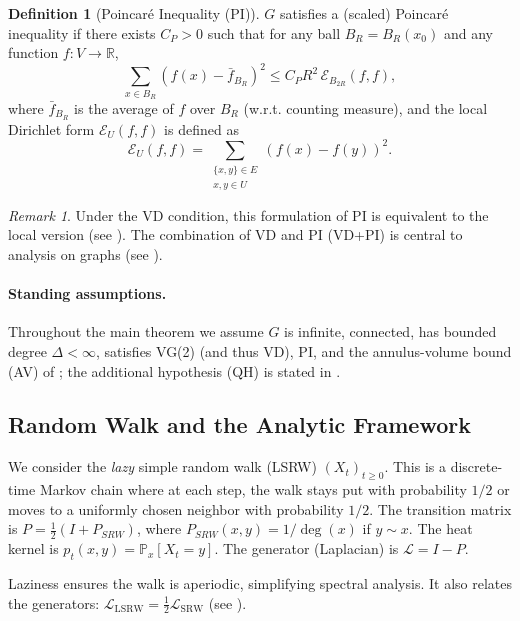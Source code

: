 \documentclass[reqno]{amsart}
\numberwithin{equation}{section}
\theoremstyle{definition}
\newtheorem{definition}[definition]{Definition}
\theoremstyle{remark}
\newtheorem{remark}[remark]{Remark}
\newcommand{\cE}{\mathcal{E}}
\newcommand{\LL}{\mathcal{L}}
\newcommand{\R}{\mathbb{R}}
\newcommand{\Prob}{\mathbb{P}}
\begin{document}
\begin{definition}[Poincaré Inequality (PI)]\label{def:PI}
$G$ satisfies a (scaled) Poincaré inequality if there exists $C_P > 0$ such that for any ball $B_R=B_R(x_0)$ and any function $f: V \to \R$,
\[
\sum_{x \in B_R} (f(x) - \bar{f}_{B_R})^2 \leq C_P R^2 \, \cE_{B_{2R}}(f,f),
\]
where $\bar{f}_{B_R}$ is the average of $f$ over $B_R$ (w.r.t. counting measure), and the local Dirichlet form $\cE_U(f,f)$ is defined as
\[
\cE_U(f,f) = \sum_{\substack{\{x,y\} \in E \\ x,y \in U}} (f(x)-f(y))^2.
\]
\end{definition}

\begin{remark}\label{rem:PI_equivalence}
Under the VD condition, this formulation of PI is equivalent to the local version (see \cite{HajlaszKoskela00}). The combination of VD and PI (VD+PI) is central to analysis on graphs (see \cite{GrigoryanTelcs12}).
\end{remark}

\paragraph{Standing assumptions.} Throughout the main theorem we assume $G$ is infinite, connected, has bounded degree $\Delta < \infty$, satisfies VG(2) (and thus VD), PI, and the annulus-volume bound (AV) of ; the additional hypothesis (QH) is stated in .

\subsection{Random Walk and the Analytic Framework}

We consider the \emph{lazy} simple random walk (LSRW) $(X_t)_{t \geq 0}$. This is a discrete-time Markov chain where at each step, the walk stays put with probability $1/2$ or moves to a uniformly chosen neighbor with probability $1/2$. The transition matrix is $P = \frac{1}{2}(I + P_{SRW})$, where $P_{SRW}(x,y) = 1/\deg(x)$ if $y \sim x$. The heat kernel is $p_t(x,y) = \Prob_x[X_t = y]$. The generator (Laplacian) is $\LL = I - P$.

Laziness ensures the walk is aperiodic, simplifying spectral analysis. It also relates the generators: $\LL_{\text{LSRW}} = \frac{1}{2} \LL_{\text{SRW}}$ (see ).
\end{document}

